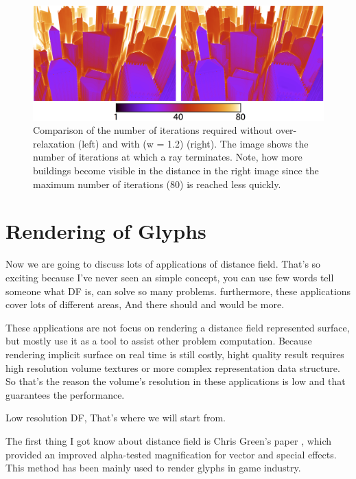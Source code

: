  \begin{figure}
 	\includegraphics[width=1.0\textwidth]{graphics/df/enhanced-sphere-tracing-result}
 	\caption{Comparison of the number of iterations required without over-relaxation (left) and with (w = 1.2) (right). The image shows the number of iterations at which a ray terminates. Note, how more buildings become visible in the distance in the right image since the maximum number of iterations (80) is reached less quickly.}
 \end{figure}









\chapter{Rendering of Glyphs}
Now we are going to discuss lots of applications of distance field. That's so exciting because I've never seen an simple concept, you can use few words tell someone what DF is, can solve so many problems. furthermore, these applications cover lots of different areas, And there should and would be more.

These applications are not focus on rendering a distance field represented surface, but mostly use it as a tool to assist other problem computation. Because rendering implicit surface on real time is still costly, hight quality result requires high resolution volume textures or more complex representation data structure. So that's the reason the volume's resolution in these applications is low and that guarantees the performance. 

Low resolution DF, That's where we will start from.

The first thing I got know about distance field is Chris Green's paper \cite{a:improved-alpha-tested-magnification-for-vector-txtures}, which provided an improved alpha-tested magnification for vector and special effects. This method has been mainly used to render glyphs in game industry.  

